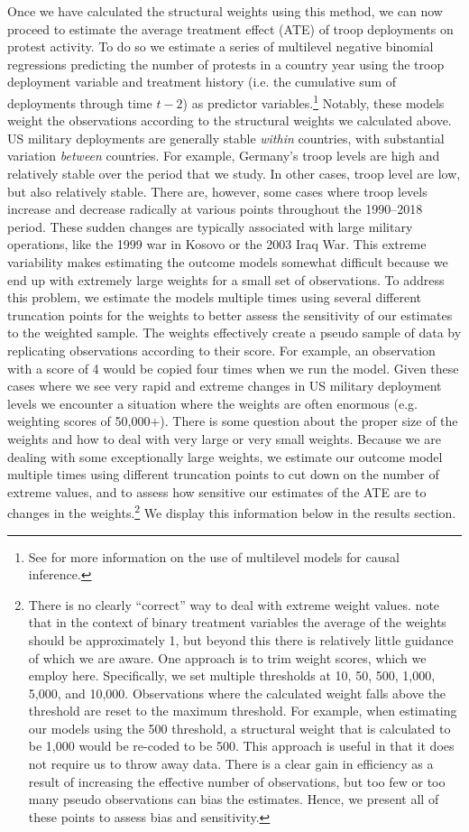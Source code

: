Once we have calculated the structural weights using this method, we can now proceed to estimate the average treatment effect (ATE) of troop deployments on protest activity. To do so we estimate a series of multilevel negative binomial regressions predicting the number of protests in a country year using the troop deployment variable and treatment history (i.e. the cumulative sum of deployments through time $t-2$) as predictor variables.\footnote{See  for more information on the use of multilevel models for causal inference.}  Notably, these models weight the observations according to the structural weights we calculated above. US military deployments are generally stable \textit{within} countries, with substantial variation \textit{between} countries. For example, Germany's troop levels are high and relatively stable over the period that we study. In other cases, troop level are low, but also relatively stable. There are, however, some cases where troop levels increase and decrease radically at various points throughout the 1990--2018 period. These sudden changes are typically associated with large military operations, like the 1999 war in Kosovo or the 2003 Iraq War. This extreme variability makes estimating the outcome models somewhat difficult because we end up with extremely large weights for a small set of observations. To address this problem, we estimate the models multiple times using several different truncation points for the weights to better assess the sensitivity of our estimates to the weighted sample. The weights effectively create a pseudo sample of data by replicating observations according to their score. For example, an observation with a score of 4 would be copied four times when we run the model. Given these cases where we see very rapid and extreme changes in US military deployment levels we encounter a situation where the weights are often enormous (e.g. weighting scores of 50,000$+$). There is some question about the proper size of the weights and how to deal with very large or very small weights. Because we are dealing with some exceptionally large weights, we estimate our outcome model multiple times using different truncation points to cut down on the number of extreme values, and to assess how sensitive our estimates of the ATE are to changes in the weights.\footnote{There is no clearly ``correct'' way to deal with extreme weight values.  note that in the context of binary treatment variables the average of the weights should be approximately 1, but beyond this there is relatively little guidance of which we are aware. One approach is to trim weight scores, which we employ here. Specifically, we set multiple thresholds at 10, 50, 500, 1,000, 5,000, and 10,000. Observations where the calculated weight falls above the threshold are reset to the maximum threshold. For example, when estimating our models using the 500 threshold, a structural weight that is calculated to be 1,000 would be re-coded to be 500. This approach is useful in that it does not require us to throw away data. There is a clear gain in efficiency as a result of increasing the effective number of observations, but too few or too many pseudo observations can bias the estimates. Hence, we present all of these points to assess bias and sensitivity.} We display this information below in the results section.



